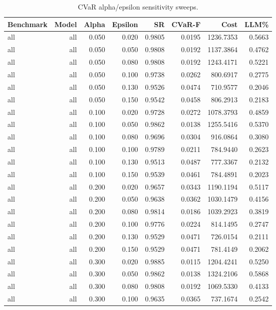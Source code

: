 \begin{table}[t]
\centering
\caption{CVaR alpha/epsilon sensitivity sweeps.}
\label{tab:router-cvar-sweeps}
\begin{tabular}{lrrrrrrr}
\hline
Benchmark & Model & Alpha & Epsilon & SR & CVaR-F & Cost & LLM\% \\
\hline
all & all & 0.050 & 0.020 & 0.9805 & 0.0195 & 1236.7353 & 0.5663 \\
all & all & 0.050 & 0.050 & 0.9808 & 0.0192 & 1137.3864 & 0.4762 \\
all & all & 0.050 & 0.080 & 0.9808 & 0.0192 & 1243.4171 & 0.5221 \\
all & all & 0.050 & 0.100 & 0.9738 & 0.0262 & 800.6917 & 0.2775 \\
all & all & 0.050 & 0.130 & 0.9526 & 0.0474 & 710.9577 & 0.2046 \\
all & all & 0.050 & 0.150 & 0.9542 & 0.0458 & 806.2913 & 0.2183 \\
all & all & 0.100 & 0.020 & 0.9728 & 0.0272 & 1078.3793 & 0.4859 \\
all & all & 0.100 & 0.050 & 0.9862 & 0.0138 & 1255.5416 & 0.5370 \\
all & all & 0.100 & 0.080 & 0.9696 & 0.0304 & 916.0864 & 0.3080 \\
all & all & 0.100 & 0.100 & 0.9789 & 0.0211 & 784.9440 & 0.2623 \\
all & all & 0.100 & 0.130 & 0.9513 & 0.0487 & 777.3367 & 0.2132 \\
all & all & 0.100 & 0.150 & 0.9539 & 0.0461 & 784.4891 & 0.2023 \\
all & all & 0.200 & 0.020 & 0.9657 & 0.0343 & 1190.1194 & 0.5117 \\
all & all & 0.200 & 0.050 & 0.9638 & 0.0362 & 1030.1479 & 0.4156 \\
all & all & 0.200 & 0.080 & 0.9814 & 0.0186 & 1039.2923 & 0.3819 \\
all & all & 0.200 & 0.100 & 0.9776 & 0.0224 & 814.1495 & 0.2747 \\
all & all & 0.200 & 0.130 & 0.9529 & 0.0471 & 726.0154 & 0.2111 \\
all & all & 0.200 & 0.150 & 0.9529 & 0.0471 & 781.4149 & 0.2062 \\
all & all & 0.300 & 0.020 & 0.9885 & 0.0115 & 1204.4241 & 0.5250 \\
all & all & 0.300 & 0.050 & 0.9862 & 0.0138 & 1324.2106 & 0.5868 \\
all & all & 0.300 & 0.080 & 0.9808 & 0.0192 & 1069.5330 & 0.4133 \\
all & all & 0.300 & 0.100 & 0.9635 & 0.0365 & 737.1674 & 0.2542 \\

\end{tabular}
\end{table}
